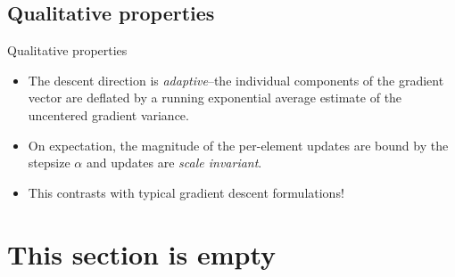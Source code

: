 \documentclass{beamer}
\numberwithin{equation}{section}
\begin{document}
\subsection{Qualitative properties}

\begin{frame}{Qualitative properties}
    \begin{itemize}
        \item
        The descent direction is \textit{adaptive}--the individual components
        of the gradient vector are deflated by a running exponential average
        estimate of the uncentered gradient variance.

        \item
        On expectation, the magnitude of the per-element updates are bound by
        the stepsize $ \alpha $ and updates are \textit{scale invariant}.

        \item
        This contrasts with typical gradient descent formulations!
    \end{itemize}
\end{frame}

\section{This section is empty}
\end{document}
